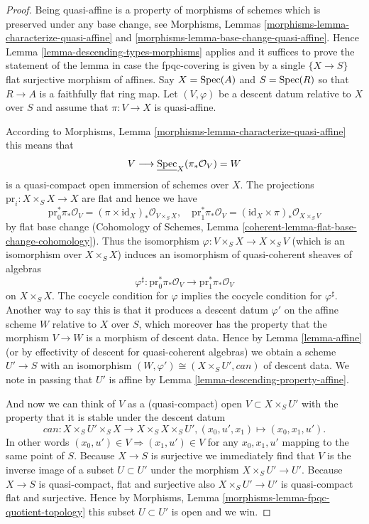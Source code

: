 \begin{proof}
Being quasi-affine is a property of morphisms of schemes
which is preserved under any base change, see
Morphisms, Lemmas \ref{morphisms-lemma-characterize-quasi-affine} and
\ref{morphisms-lemma-base-change-quasi-affine}.
Hence Lemma \ref{lemma-descending-types-morphisms} applies
and it suffices to prove the statement of the lemma
in case the fpqc-covering is given by a single
$\{X \to S\}$ flat surjective morphism of affines.
Say $X = \mathop{\mathrm{Spec}}(A)$ and $S = \mathop{\mathrm{Spec}}(R)$ so
that $R \to A$ is a faithfully flat ring map.
Let $(V, \varphi)$ be a descent datum relative to $X$ over $S$
and assume that $\pi : V \to X$ is quasi-affine.

\medskip\noindent
According to Morphisms, Lemma \ref{morphisms-lemma-characterize-quasi-affine}
this means that
$$
V \longrightarrow \underline{\mathop{\mathrm{Spec}}}_X(\pi_*\mathcal{O}_V) = W
$$
is a quasi-compact open immersion of schemes over $X$.
The projections $\text{pr}_i : X \times_S X \to X$ are flat
and hence we have
$$
\text{pr}_0^*\pi_*\mathcal{O}_V =
(\pi \times \text{id}_X)_*\mathcal{O}_{V \times_S X}, \quad
\text{pr}_1^*\pi_*\mathcal{O}_V =
(\text{id}_X \times \pi)_*\mathcal{O}_{X \times_S V}
$$
by flat base change
(Cohomology of Schemes, Lemma \ref{coherent-lemma-flat-base-change-cohomology}).
Thus the isomorphism $\varphi : V \times_S X \to X \times_S V$ (which
is an isomorphism over $X \times_S X$) induces an isomorphism
of quasi-coherent sheaves of algebras
$$
\varphi^\sharp :
\text{pr}_0^*\pi_*\mathcal{O}_V
\longrightarrow
\text{pr}_1^*\pi_*\mathcal{O}_V
$$
on $X \times_S X$.
The cocycle condition for $\varphi$ implies the cocycle condition
for $\varphi^\sharp$. Another way to say this is that it produces
a descent datum $\varphi'$ on the affine scheme $W$ relative to
$X$ over $S$, which moreover has the property that the morphism
$V \to W$ is a morphism of descent data.
Hence by Lemma \ref{lemma-affine}
(or by effectivity of descent for quasi-coherent
algebras) we obtain a scheme $U' \to S$ with an isomorphism
$(W, \varphi') \cong (X \times_S U', can)$ of descent data.
We note in passing that $U'$ is affine by
Lemma \ref{lemma-descending-property-affine}.

\medskip\noindent
And now we can think of $V$ as a (quasi-compact)
open $V \subset X \times_S U'$ with the property that
it is stable under the descent datum
$$
can : X \times_S U' \times_S X \to X \times_S X \times_S U',
(x_0, u', x_1) \mapsto (x_0, x_1, u').
$$
In other words $(x_0, u') \in V \Rightarrow (x_1, u') \in V$
for any $x_0, x_1, u'$ mapping to the same point of $S$.
Because $X \to S$ is surjective we immediately find that
$V$ is the inverse image of a subset $U \subset U'$ under
the morphism $X \times_S U' \to U'$.
Because $X \to S$ is quasi-compact, flat and surjective
also $X \times_S U' \to U'$ is quasi-compact flat and surjective.
Hence by Morphisms, Lemma \ref{morphisms-lemma-fpqc-quotient-topology}
this subset $U \subset U'$ is open and we win.
\end{proof}












